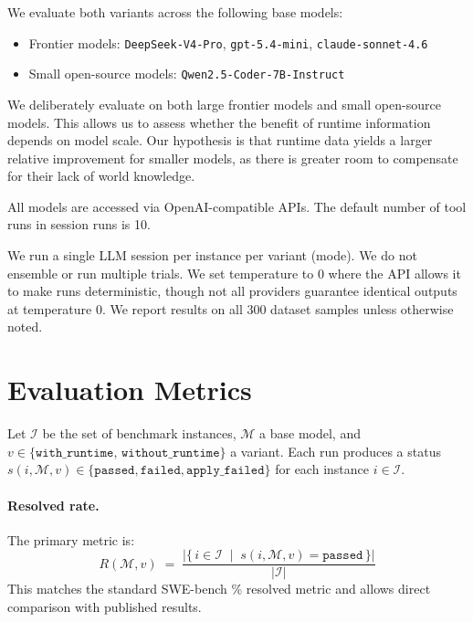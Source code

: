 We evaluate both variants across the following base models:

\begin{itemize}\setlength{\itemsep}{6pt}
    \item Frontier models: \texttt{DeepSeek-V4-Pro}, \texttt{gpt-5.4-mini}, \texttt{claude-sonnet-4.6}
    \item Small open-source models: \texttt{Qwen2.5-Coder-7B-Instruct}
\end{itemize}

We deliberately evaluate on both large frontier models and small open-source models. This allows us to assess whether the benefit of runtime information depends on model scale. Our hypothesis is that runtime data yields a larger relative improvement for smaller models, as there is greater room to compensate for their lack of world knowledge.

All models are accessed via OpenAI-compatible APIs. The default number of tool runs in session runs is 10.

We run a single LLM session per instance per variant (mode). We do not ensemble or run multiple trials. We set temperature to 0 where the API allows it to make runs deterministic, though not all providers guarantee identical outputs at temperature 0. We report results on all 300 dataset samples unless otherwise noted.

\section{Evaluation Metrics}
\label{sec:eval-metrics}

Let $\mathcal{I}$ be the set of benchmark instances, $\mathcal{M}$ a base model, and $v \in \{\texttt{with\_runtime},\, \texttt{without\_runtime}\}$ a variant. Each run produces a status $s(i, \mathcal{M}, v) \in \{\texttt{passed}, \texttt{failed}, \texttt{apply\_failed}\}$ for each instance $i \in \mathcal{I}$.

\paragraph{Resolved rate.} The primary metric is:
\[
  R(\mathcal{M}, v) \;=\; \frac{\bigl|\{\, i \in \mathcal{I} \;\mid\; s(i, \mathcal{M}, v) = \texttt{passed} \,\}\bigr|}{|\mathcal{I}|}
\]
This matches the standard SWE-bench \% resolved metric and allows direct comparison with published results.

